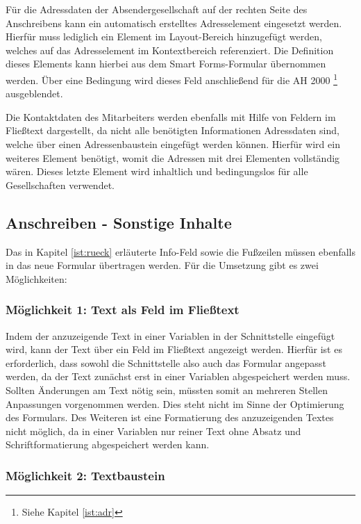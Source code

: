 Für die Adressdaten der Absendergesellschaft auf der rechten Seite des Anschreibens kann ein automatisch erstelltes Adresselement eingesetzt werden. Hierfür muss lediglich ein Element im Layout-Bereich hinzugefügt werden, welches auf das Adresselement im Kontextbereich referenziert. Die Definition dieses Elements kann hierbei aus dem Smart Forms-Formular übernommen werden. Über eine Bedingung wird dieses Feld anschließend für die \ac{AH} 2000 \footnote{Siehe Kapitel \ref{ist:adr}} ausgeblendet.

Die Kontaktdaten des Mitarbeiters werden ebenfalls mit Hilfe von Feldern im Fließtext dargestellt, da nicht alle benötigten Informationen Adressdaten sind, welche über einen Adressenbaustein eingefügt werden können. Hierfür wird ein weiteres Element benötigt, womit die Adressen mit drei Elementen vollständig wären. Dieses letzte Element wird inhaltlich und bedingungslos für alle Gesellschaften verwendet.

\subsection{Anschreiben - Sonstige Inhalte}

Das in Kapitel \ref{ist:rueck} erläuterte Info-Feld sowie die Fußzeilen müssen ebenfalls in das neue Formular übertragen werden. Für die Umsetzung gibt es zwei Möglichkeiten:

\subsubsection{Möglichkeit 1: Text als Feld im Fließtext}

Indem der anzuzeigende Text in einer Variablen in der Schnittstelle eingefügt wird, kann der Text über ein Feld im Fließtext angezeigt werden. Hierfür ist es erforderlich, dass sowohl die Schnittstelle also auch das Formular angepasst werden, da der Text zunächst erst in einer Variablen abgespeichert werden muss. Sollten Änderungen am Text nötig sein, müssten somit an mehreren Stellen Anpassungen vorgenommen werden. Dies steht nicht im Sinne der Optimierung des Formulars. Des Weiteren ist eine Formatierung des anzuzeigenden Textes nicht möglich, da in einer Variablen nur reiner Text ohne Absatz und Schriftformatierung abgespeichert werden kann.

\subsubsection{Möglichkeit 2: Textbaustein}

